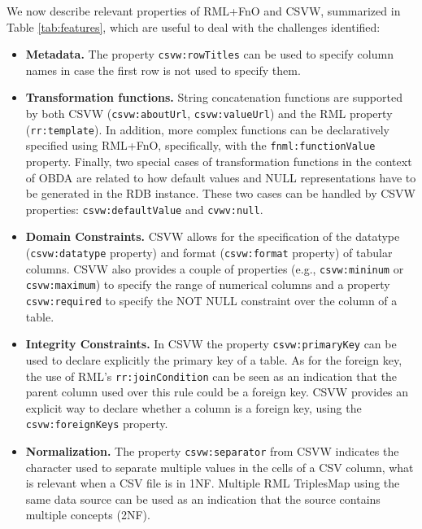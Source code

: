We now describe relevant properties of RML+FnO and CSVW, summarized in Table \ref{tab:features}, which are useful to deal with the challenges identified:
\begin{itemize}
    \item \textbf{Metadata.} The property \texttt{csvw:rowTitles} can be used to specify column names in case the first row is not used to specify them.
    \item \textbf{Transformation functions.} String concatenation functions are supported by both CSVW (\texttt{csvw:aboutUrl}, \texttt{csvw:valueUrl}) and the RML property (\texttt{rr:template}). In addition, more complex functions can be declaratively specified using RML+FnO, specifically, with the \texttt{fnml:functionValue} property. Finally, two special cases of transformation functions in the context of OBDA are related to how default values and NULL representations have to be generated in the RDB instance. These two cases can be handled by CSVW properties: \texttt{csvw:defaultValue} and \texttt{cvwv:null}.
    
    \item \textbf{Domain Constraints.} CSVW allows for the specification of the datatype (\texttt{csvw:datatype} property) and format (\texttt{csvw:format} property) of tabular columns. CSVW also provides a couple of properties (e.g., \texttt{csvw:mininum} or \texttt{csvw:maximum}) to specify the range of numerical columns and a property \texttt{csvw:required} to specify the NOT NULL constraint over the column of a table.
    
    \item \textbf{Integrity Constraints.} In CSVW the property \texttt{csvw:primaryKey} can be used to declare explicitly the primary key of a table. As for the foreign key, the use of RML's \texttt{rr:joinCondition} can be seen as an indication that the parent column used over this rule could be a foreign key. CSVW provides an explicit way to declare whether a column is a foreign key, using the \texttt{csvw:foreignKeys} property. 
    
    \item \textbf{Normalization.} The property \texttt{csvw:separator} from CSVW indicates the character used to separate multiple values in the cells of a CSV column, what is relevant when a CSV file is in 1NF. Multiple RML TriplesMap using the same data source can be used as an indication that the source contains multiple concepts (2NF).
\end{itemize}




